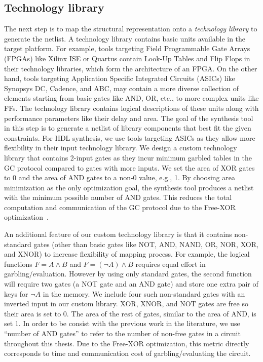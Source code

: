 \subsection{Technology library}
The next step is to map the structural representation onto a \emph{technology library} to generate the netlist.
A technology library contains basic units available in the target platform.
For example, tools targeting Field Programmable Gate Arrays (FPGAs) like Xilinx ISE or Quartus contain Look-Up Tables and Flip Flops in their technology libraries, which form the architecture of an FPGA.
On the other hand, tools targeting Application Specific Integrated Circuits (ASICs) like Synopsys DC, Cadence, and ABC, may contain a more diverse collection of elements starting from basic gates like AND, OR, etc., to more complex units like FFs.
The technology library contains logical descriptions of these units along with performance parameters like their delay and area.
The goal of the synthesis tool in this step is to generate a netlist of library components that best fit the given constraints.
For HDL synthesis, we use tools targeting ASICs as they allow more flexibility in their input technology library.
We design a custom technology library that contains 2-input gates as they incur minimum garbled tables in the GC protocol compared to gates with more inputs.
We set the area of XOR gates to 0 and the area of AND gates to a non-0 value, e.g., 1.
By choosing area minimization as the only optimization goal, the synthesis tool produces a netlist with the minimum possible number of AND gates.
This reduces the total computation and communication of the GC protocol due to the Free-XOR optimization~\cite{kolesnikov2008improved}.

An additional feature of our custom technology library is that it contains non-standard gates (other than basic gates like NOT, AND, NAND, OR, NOR, XOR, and XNOR) to increase flexibility of mapping process.
For example, the logical functions $F = A\wedge B$ and $F = (\neg A)\wedge B$ requires equal effort in garbling/evaluation.
However by using only standard gates, the second function will require two gates (a NOT gate and an AND gate) and store one extra pair of keys for $\neg A$ in the memory.
We include four such non-standard gates with an inverted input in our custom library.
XOR, XNOR, and NOT gates are free so their area is set to 0.
The area of the rest of gates, similar to the area of AND, is set 1.
In order to be consist with the previous work in the literature, we use ``number of AND gates'' to refer to the number of non-free gates in a circuit throughout this thesis.
Due to the Free-XOR optimization, this metric directly corresponds to time and communication cost of garbling/evaluating the circuit.

